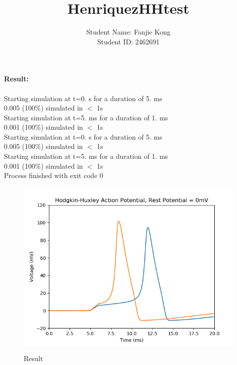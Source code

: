 \documentclass[12pt]{article}
\title{HenriquezHHtest}
\author{Student Name: Fanjie Kong
\\
Student ID: 2462691 }
\begin{document}
\maketitle
\newpage
\textbf{Result:}
\\\\
Starting simulation at t=0. s for a duration of 5. ms\\
0.005 (100\%) simulated in $<$ 1s
\\
Starting simulation at t=5. ms for a duration of 1. ms\\
0.001 (100\%) simulated in $<$ 1s 
\\
Starting simulation at t=0. s for a duration of 5. ms\\
0.005 (100\%) simulated in $<$ 1s
\\
Starting simulation at t=5. ms for a duration of 1. ms\\
0.001 (100\%) simulated in $<$ 1s
\\

Process finished with exit code 0
\\
 \begin{figure}[H]
  \centering
  \includegraphics[width=.8\textwidth]{h1_p1.png} %
  \label{img} %
  \caption{Result}
\end{figure}
\end{document}
